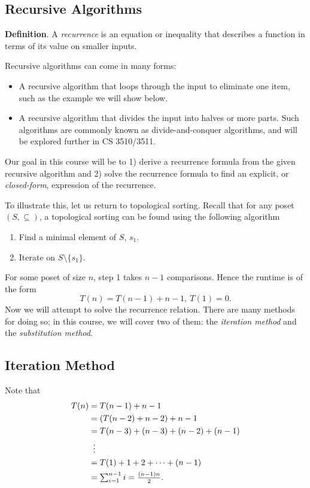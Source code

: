 \documentclass{article}
\begin{document}
\subsection*{Recursive Algorithms}
    \textbf{Definition}. A \textit{recurrence} is an equation or inequality that describes a function in terms of its value on smaller inputs.
    
    \vspace{1.5mm}
    Recursive algorithms can come in many forms:
    \begin{itemize}
        \item A recursive algorithm that loops through the input to eliminate one item, such as the example we will show below.
        \item A recursive algorithm that divides the input into halves or more parts. Such algorithms are commonly known as divide-and-conquer algorithms, and will be explored further in CS 3510/3511.
    \end{itemize}
    
    Our goal in this course will be to 1) derive a recurrence formula from the given recursive algorithm and 2) solve the recurrence formula to find an explicit, or \textit{closed-form}, expression of the recurrence.
    
    \vspace{1.5mm}
    To illustrate this, let us return to topological sorting. Recall that for any poset $(S, \subseteq)$, a topological sorting can be found using the following algorithm
    \begin{enumerate}[label = \arabic*.]
        \item Find a minimal element of $S$, $s_{1}$.
        \item Iterate on $S \setminus \{s_{1}\}$.
    \end{enumerate}
    For some poset of size $n$, step 1 takes $n - 1$ comparisons. Hence the runtime is of the form $$T(n) = T(n - 1) + n  - 1,\ T(1) = 0.$$ Now we will attempt to solve the recurrence relation. There are many methods for doing so; in this course, we will cover two of them: the \textit{iteration method} and the \textit{substitution method}.

\subsection*{Iteration Method}
    Note that 
    $$\begin{aligned}[t]
        T(n) &= T(n - 1) + n - 1 \\
        &= (T(n - 2) + n - 2) + n - 1 \\
        &= T(n - 3) + (n - 3) + (n - 2) + (n - 1) \\
        &\vdotswithin{ = } \\
        &= T(1) + 1 + 2 + \dots + (n - 1) \\
        &= \textstyle\sum_{i = 1}^{n - 1} i = \tfrac{(n - 1)n}{2}.
    \end{aligned}$$
    
\end{document}
